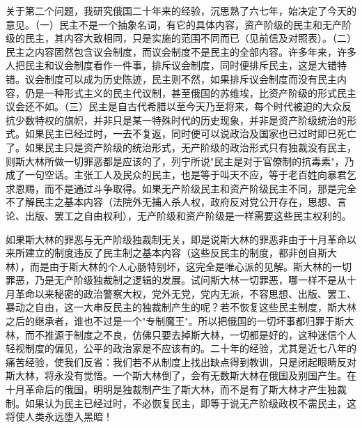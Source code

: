 \documentclass[
  openany,           %
  12pt,              %
  a4paper            %
]{ctexbook}
\begin{document}
关于第二个问题，我研究俄国二十年来的经验，沉思熟了六七年，始决定了今天的意见。（一）民主不是一个抽象名词，有它的具体内容，资产阶级的民主和无产阶级的民主，其内容大致相同，只是实施的范围不同而已（见前信及对照表）。（二）民主之内容固然包含议会制度，而议会制度不是民主的全部内容。许多年来，许多人把民主和议会制度看作一件事，排斥议会制度，同时便排斥民主，这是大错特错。议会制度可以成为历史陈迹，民主则不然，如果排斥议会制度而没有民主内容，仍是一种形式主义的民主代议制，甚至俄国的苏维埃，比资产阶级的形式民主议会还不如。（三）民主是自古代希腊以至今天乃至将来，每个时代被迫的大众反抗少数特权的旗帜，并非只是某一特殊时代的历史现象，并非是资产阶级统治的形式。如果民主已经过时，一去不复返，同时便可以说政治及国家也已过时即已死亡了。如果民主只是资产阶级的统治形式，无产阶级的政治形式只有独裁没有民主，则斯大林所做一切罪恶都是应该的了，列宁所说"民主是对于官僚制的抗毒素"，乃成了一句空话。主张工人及民众的民主，也是等于叫天不应，等于老百姓向暴君乞求恩赐，而不是通过斗争取得。如果无产阶级民主和资产阶级民主不同，那是完全不了解民主之基本内容（法院外无捕人杀人权，政府反对党公开存在，思想、言论、出版、罢工之自由权利），无产阶级和资产阶级是一样需要这些民主权利的。

如果斯大林的罪恶与无产阶级独裁制无关，即是说斯大林的罪恶非由于十月革命以来所建立的制度违反了民主制之基本内容（这些反民主的制度，都非创自斯大林），而是由于斯大林的个人心肠特别坏，这完全是唯心派的见解。斯大林的一切罪恶，乃是无产阶级独裁制之逻辑的发展。试问斯大林一切罪恶，哪一样不是从十月革命以来秘密的政治警察大权，党外无党，党内无派，不容思想、出版、罢工、暴动之自由，这一大串反民主的独裁制产生的呢？若不恢复这些民主制度，斯大林之后的继承者，谁也不过是一个"专制魔王"。所以把俄国的一切坏事都归罪于斯大林，而不推源于制度之不良，仿佛只要去掉斯大林，一切都是好的，这种迷信个人轻视制度的偏见，公平的政治家是不应该有的。二十年的经验，尤其是近七八年的痛苦经验，使我们反省：我们若不从制度上找出缺点得到教训，只是闭起眼睛反对斯大林，将永没有觉悟。一个斯大林倒了，会有无数斯大林在俄国及别国产生。在十月革命后的俄国，明明是独裁制产生了斯大林，而不是有了斯大林才产生独裁制。如果认为民主已经过时，不必恢复民主，即等于说无产阶级政权不需民主，这将使人类永远堕入黑暗！
\end{document}
